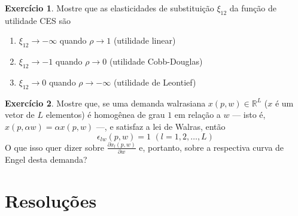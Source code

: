 \documentclass[12pt]{article}
\numberwithin{equation}{section}
\theoremstyle{plain}
\theoremstyle{definition}
\newtheorem{exercise}{Exercício}
\theoremstyle{remark}
\begin{document}
\begin{exercise}
    Mostre que as elasticidades de substituição
    \(\xi_{12}\) da função de utilidade CES são 
    
    \begin{enumerate}
        \item \(\xi_{12} \to -\infty\) quando \(\rho \to 1\) (utilidade linear) 
        \item \(\xi_{12} \to -1\) quando \(\rho \to 0\) (utilidade Cobb-Douglas) 
        \item \(\xi_{12} \to 0\) quando \(\rho \to -\infty\) (utilidade de Leontief)
    \end{enumerate}
\end{exercise}


\begin{exercise}
    Mostre que, se uma demanda walrasiana
    \(x(p,w) \in \mathbb{R}^L\) (\(x\) é um vetor de \(L\) elementos) é
    homogênea de grau \(1\) em relação a \(w\) --- isto é,
    \(x(p, \alpha w) = \alpha x(p,w)\) ---, e satisfaz a lei de Walras,
    então \[
    \epsilon_{lw}(p, w) = 1 \,\, (l = 1, 2, \dots, L)
    \] O que isso quer dizer sobre
    \(\frac{ \partial x_{l}(p,w) }{ \partial w}\) e, portanto, sobre a
    respectiva curva de Engel desta demanda?

\end{exercise}


\section{Resoluções}

\setcounter{exercise}{0}
\end{document}
